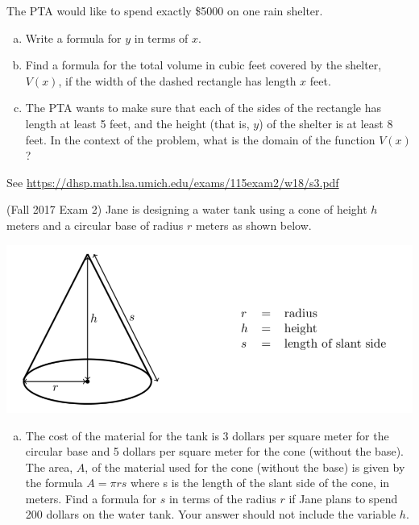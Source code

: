 \documentclass[11pt]{exam}
\begin{document}
\begin{questions}
The PTA would like to spend exactly \$5000 on one rain shelter.
\begin{enumerate}[(a)]
\item Write a formula for $y$ in terms of $x$.
\item Find a formula for the total volume in cubic feet covered by the shelter, $V (x)$, if the width of the dashed rectangle has length $x$ feet.
\item The PTA wants to make sure that each of the sides of the rectangle has length at least 5 feet, and the height (that is, $y$) of the shelter is at least 8 feet. In the context of the problem, what is the domain of the function $V (x)$?
\end{enumerate}
\begin{solution}
  See \href{https://dhsp.math.lsa.umich.edu/exams/115exam2/w18/s3.pdf}{https://dhsp.math.lsa.umich.edu/exams/115exam2/w18/s3.pdf}
\end{solution}
\pagebreak
\question (Fall 2017 Exam 2) %
Jane is designing a water tank using a cone of height $h$ meters and a circular base of radius $r$ meters as shown below.
\begin{center}
  \includegraphics[scale=0.45]{Figures/jane.png}
\end{center}
\begin{enumerate}[(a)]
\item The cost of the material for the tank is 3 dollars per square meter for the circular base and 5 dollars per square meter for the cone (without the base). The area, $A$, of the material used for the cone (without the base) is given by the formula $A = \pi rs$ where s is the length of the slant side of the cone, in meters. Find a formula for $s$ in terms of the radius $r$ if Jane plans to spend 200 dollars on the water tank. Your answer should not include the variable $h$.

\end{enumerate}
\end{questions}
\end{document}
